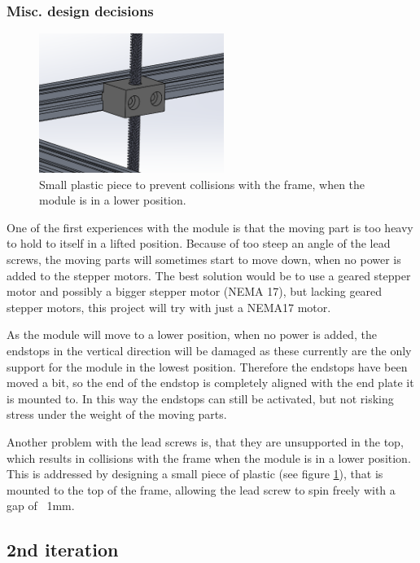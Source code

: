 \documentclass[10pt,a4paper]{article}
\begin{document}
		\subsubsection{Misc. design decisions}
		\begin{figure}
			\includegraphics[width=6cm]{images/leadScrewSupport.png}
			\caption{Small plastic piece to prevent collisions with the frame, when the module is in a lower position.}
			\label{fig::leadScrewSupport}
		\end{figure}
		
		One of the first experiences with the module is that the moving part is too heavy to hold to itself in a lifted position. Because of too steep an angle of the lead screws, the moving parts will sometimes start to move down, when no power is added to the stepper motors. The best solution would be to use a geared stepper motor and possibly a bigger stepper motor (NEMA 17), but lacking geared stepper motors, this project will try with just a NEMA17 motor.
		
		As the module will move to a lower position, when no power is added, the endstops in the vertical direction will be damaged as these currently are the only support for the module in the lowest position. Therefore the endstops have been moved a bit, so the end of the endstop is completely aligned with the end plate it is mounted to. In this way the endstops can still be activated, but not risking stress under the weight of the moving parts.
		
		Another problem with the lead screws is, that they are unsupported in the top, which results in collisions with the frame when the module is in a lower position. This is addressed by designing a small piece of plastic (see figure \ref{fig::leadScrewSupport}), that is mounted to the top of the frame, allowing the lead screw to spin freely with a gap of ~1mm.
		
		
				
	\subsection{2nd iteration}
	
\end{document}
